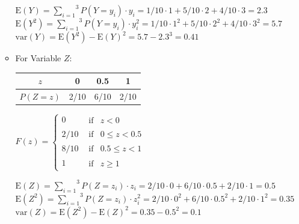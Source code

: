 \documentclass[12pt,thmsa]{article}\usepackage[]{graphicx}\usepackage[]{color}
\begin{document}
\begin{enumerate}
\begin{itemize}
			\begin{center}
			$\mbox{E}(Y) = \overset{3}{\underset{i=1}{\sum}}P(Y=y_i)\cdot y_i = 1/10\cdot1 + 5/10\cdot 2 + 4/10\cdot3 = 2.3$ \\
			$\mbox{E}(Y^2) = \overset{3}{\underset{i=1}{\sum}}P(Y=y_i)\cdot y_i^2 = 1/10\cdot1^2 + 5/10\cdot 2^2 + 4/10\cdot3^2 = 5.7 $\\
			$\mbox{var}(Y) =  \mbox{E}(Y^2) - \mbox{E}(Y)^2 = 5.7 - 2.3^3 = 0.41$
			\end{center}
			\bigskip

\item 		For Variable $Z$:
			\begin{center}
			\begin{tabular}{|c|c|c|c|}
			\hline
			$z$ & 0 & 0.5 & 1 \\
			\hline
			$P(Z=z)$ & 2/10 & 6/10 & 2/10\\
			\hline
			\end{tabular}
			\end{center}

			\medskip
			\begin{center}
			$F(z)=\begin{cases}
			0 & \begin{array}{cc} \textrm{if} & z<0\end{array}\\
			2/10 & \begin{array}{cc} \textrm{if} & 0\leq z<0.5\end{array}\\
			8/10 & \begin{array}{cc}	\textrm{if} & 0.5\leq z<1\end{array}\\
			1 & \begin{array}{cc} \textrm{if} &  z\geq 1\end{array}
			\end{cases}$
			\end{center}

			\begin{center}
			$\mbox{E}(Z) = \overset{3}{\underset{i=1}{\sum}}P(Z=z_i)\cdot z_i = 2/10\cdot0 + 6/10\cdot0.5 + 2/10\cdot1 = 0.5$ \\
			$\mbox{E}(Z^2) = \overset{3}{\underset{i=1}{\sum}}P(Z=z_i)\cdot z_i^2 = 2/10\cdot0^2 + 6/10\cdot0.5^2 + 2/10\cdot1^2 = 0.35 $\\
			$\mbox{var}(Z) =  \mbox{E}(Z^2) - \mbox{E}(Z)^2 = 0.35 - 0.5^2 = 0.1$
			\end{center}


\end{itemize}
\end{enumerate}
\end{document}
